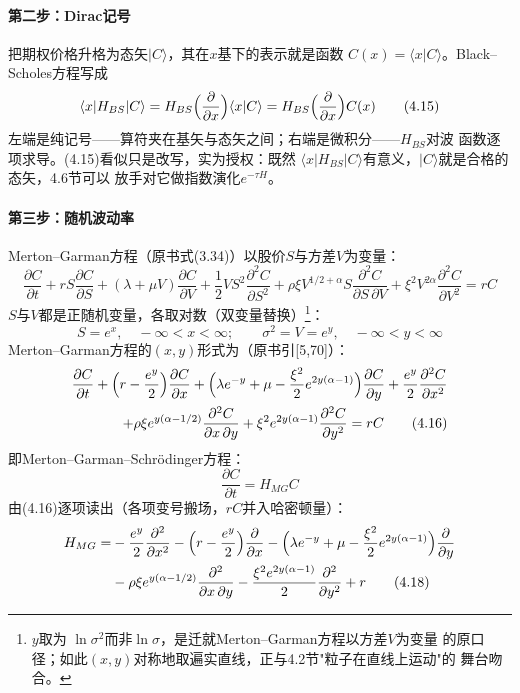 \paragraph{第二步：Dirac记号}
把期权价格升格为态矢$|C\rangle$，其在$x$基下的表示就是函数
$C(x)=\langle x|C\rangle$。Black--Scholes方程写成
\begin{equation*}
\langle x|H_{BS}|C\rangle
=H_{BS}\Bigl(\frac{\partial}{\partial x}\Bigr)\langle x|C\rangle
=H_{BS}\Bigl(\frac{\partial}{\partial x}\Bigr)C(x)
\tag{4.15}
\end{equation*}
左端是纯记号——算符夹在基矢与态矢之间；右端是微积分——$H_{BS}$对波
函数逐项求导。(4.15)看似只是改写，实为授权：既然
$\langle x|H_{BS}|C\rangle$有意义，$|C\rangle$就是合格的态矢，4.6节可以
放手对它做指数演化$e^{-\tau H}$。

\paragraph{第三步：随机波动率}
Merton--Garman方程（原书式(3.34)）以股价$S$与方差$V$为变量：
\begin{equation*}
\frac{\partial C}{\partial t}
+rS\frac{\partial C}{\partial S}
+(\lambda+\mu V)\frac{\partial C}{\partial V}
+\frac{1}{2}VS^{2}\frac{\partial^{2}C}{\partial S^{2}}
+\rho\xi V^{1/2+\alpha}S\frac{\partial^{2}C}{\partial S\,\partial V}
+\xi^{2}V^{2\alpha}\frac{\partial^{2}C}{\partial V^{2}}
=rC
\end{equation*}
$S$与$V$都是正随机变量，各取对数（双变量替换）\footnote{$y$取为
$\ln\sigma^{2}$而非$\ln\sigma$，是迁就Merton--Garman方程以方差$V$为变量
的原口径；如此$(x,y)$对称地取遍实直线，正与4.2节"粒子在直线上运动"的
舞台吻合。}：
\begin{equation*}
S=e^{x},\quad -\infty<x<\infty;\qquad
\sigma^{2}=V=e^{y},\quad -\infty<y<\infty
\end{equation*}
Merton--Garman方程的$(x,y)$形式为（原书引[5,70]）：
\begin{align*}
\frac{\partial C}{\partial t}
+\Bigl(r-\frac{e^{y}}{2}\Bigr)\frac{\partial C}{\partial x}
+\Bigl(\lambda e^{-y}+\mu-\frac{\xi^{2}}{2}e^{2y(\alpha-1)}\Bigr)
\frac{\partial C}{\partial y}
+\frac{e^{y}}{2}\frac{\partial^{2}C}{\partial x^{2}}\notag\\
+\rho\xi e^{y(\alpha-1/2)}\frac{\partial^{2}C}{\partial x\,\partial y}
+\xi^{2}e^{2y(\alpha-1)}\frac{\partial^{2}C}{\partial y^{2}}
=rC
\tag{4.16}
\end{align*}
即Merton--Garman--Schr\"odinger方程：
\begin{equation*}
\frac{\partial C}{\partial t}=H_{MG}C
\tag{4.17}
\end{equation*}
由(4.16)逐项读出（各项变号搬场，$rC$并入哈密顿量）：
\begin{align*}
H_{MG}=&-\frac{e^{y}}{2}\frac{\partial^{2}}{\partial x^{2}}
-\Bigl(r-\frac{e^{y}}{2}\Bigr)\frac{\partial}{\partial x}
-\Bigl(\lambda e^{-y}+\mu-\frac{\xi^{2}}{2}e^{2y(\alpha-1)}\Bigr)
\frac{\partial}{\partial y}\\
&-\rho\xi e^{y(\alpha-1/2)}\frac{\partial^{2}}{\partial x\,\partial y}
-\frac{\xi^{2}e^{2y(\alpha-1)}}{2}\frac{\partial^{2}}{\partial y^{2}}
+r
\tag{4.18}
\end{align*}

